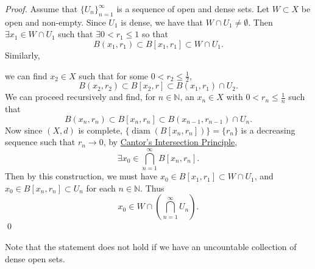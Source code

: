 \documentclass[notoc,notitlepage]{tufte-book}
\DeclareMathOperator{\diam}{diam }
\begin{document}
\begin{proof}
  Assume that $\{ U_n \}_{n = 1}^{\infty}$ is a sequence of open and dense sets. Let $W \subset X$ be open and non-empty. Since $U_1$ is dense, we have that $W \cap U_1 \neq \emptyset$. Then $\exists x_1 \in W \cap U_1$ such that $\exists 0 < r_1 \leq 1$ so that
  \begin{equation*}
    B(x_1, r_1) \subset B[x_1, r_1] \subset W \cap U_1.
  \end{equation*}
  Similarly,
  \begin{marginfigure}
    \centering
    \caption{Visualization of proof for Baire Category Theorem I}\label{fig:visualization_of_proof_for_baire_category_theorem_i}
  \end{marginfigure}
  we can find $x_2 \in X$ such that for some $0 < r_2 \leq \frac{1}{2}$,
  \begin{equation*}
    B ( x_2 , r_2 ) \subset B [ x_2, r ] \subset B(x_1, r_1) \cap U_2.
  \end{equation*}
  We can proceed recursively and find, for $n \in \mathbb{N}$, an $x_{n} \in X$ with $0 < r_{n} \leq \frac{1}{n}$ such that
  \begin{equation*}
    B ( x_n, r_n ) \subset B [ x_n, r_n ] \subset B ( x_{n - 1}, r_{n - 1} ) \cap U_{n}.
  \end{equation*}
  Now since $(X, d)$ is complete, $\{ \diam( B [x_n, r_n] ) \} = \{ r_n \}$ is a decreasing sequence such that $r_n \to 0$, by \hyperref[thm:cantor_s_intersection_principle]{Cantor's Intersection Principle},
  \begin{equation*}
    \exists x_0 \in \bigcap_{n=1}^{\infty} B[x_n, r_n].
  \end{equation*}
  Then by this construction, we must have $x_0 \in B[x_1, r_1] \subset W \cap U_1$, and $x_0 \in B[ x_n, r_n ] \subset U_n$ for each $n \in \mathbb{N}$. Thus
  \begin{equation*}
    x_0 \in W \cap \left( \bigcap_{n=1}^{\infty} U_n \right).
  \end{equation*}\qed\
\end{proof}

Note that the statement does not hold if we have an uncountable collection of dense open sets.
\end{document}
